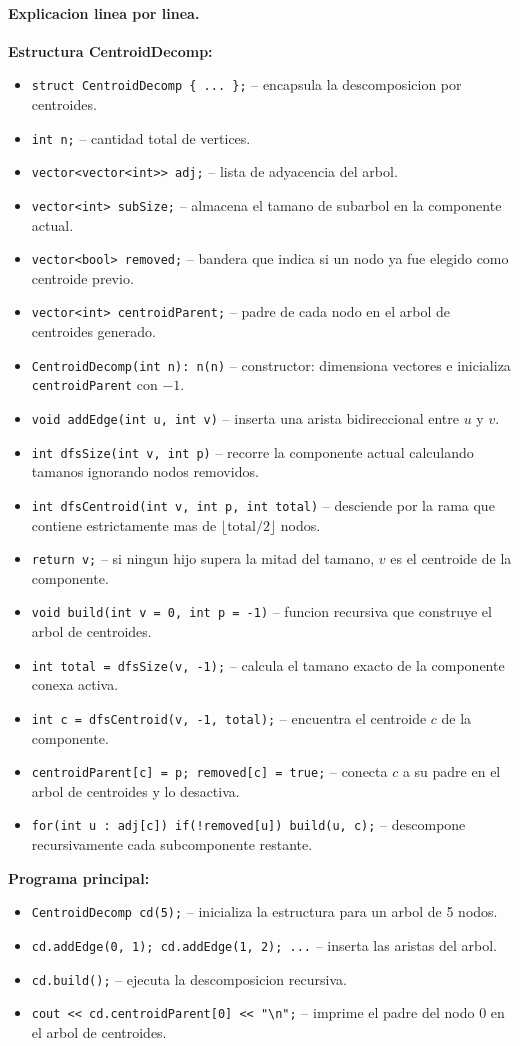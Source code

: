 \paragraph{Explicacion linea por linea.}
\textbf{Estructura CentroidDecomp:}
\begin{itemize}\setlength\itemsep{0pt}
	\item \verb|struct CentroidDecomp { ... };| -- encapsula la descomposicion por centroides.
	\item \verb|int n;| -- cantidad total de vertices.
	\item \verb|vector<vector<int>> adj;| -- lista de adyacencia del arbol.
	\item \verb|vector<int> subSize;| -- almacena el tamano de subarbol en la componente actual.
	\item \verb|vector<bool> removed;| -- bandera que indica si un nodo ya fue elegido como centroide previo.
	\item \verb|vector<int> centroidParent;| -- padre de cada nodo en el arbol de centroides generado.
	\item \verb|CentroidDecomp(int n): n(n)| -- constructor: dimensiona vectores e inicializa \verb|centroidParent| con $-1$.
	\item \verb|void addEdge(int u, int v)| -- inserta una arista bidireccional entre $u$ y $v$.
	\item \verb|int dfsSize(int v, int p)| -- recorre la componente actual calculando tamanos ignorando nodos removidos.
	\item \verb|int dfsCentroid(int v, int p, int total)| -- desciende por la rama que contiene estrictamente mas de $\lfloor \text{total} / 2 \rfloor$ nodos.
	\item \verb|return v;| -- si ningun hijo supera la mitad del tamano, $v$ es el centroide de la componente.
	\item \verb|void build(int v = 0, int p = -1)| -- funcion recursiva que construye el arbol de centroides.
	\item \verb|int total = dfsSize(v, -1);| -- calcula el tamano exacto de la componente conexa activa.
	\item \verb|int c = dfsCentroid(v, -1, total);| -- encuentra el centroide $c$ de la componente.
	\item \verb|centroidParent[c] = p; removed[c] = true;| -- conecta $c$ a su padre en el arbol de centroides y lo desactiva.
	\item \verb|for(int u : adj[c]) if(!removed[u]) build(u, c);| -- descompone recursivamente cada subcomponente restante.
\end{itemize}
\textbf{Programa principal:}
\begin{itemize}\setlength\itemsep{0pt}
	\item \verb|CentroidDecomp cd(5);| -- inicializa la estructura para un arbol de 5 nodos.
	\item \verb|cd.addEdge(0, 1); cd.addEdge(1, 2); ...| -- inserta las aristas del arbol.
	\item \verb|cd.build();| -- ejecuta la descomposicion recursiva.
	\item \verb|cout << cd.centroidParent[0] << "\n";| -- imprime el padre del nodo 0 en el arbol de centroides.
\end{itemize}

